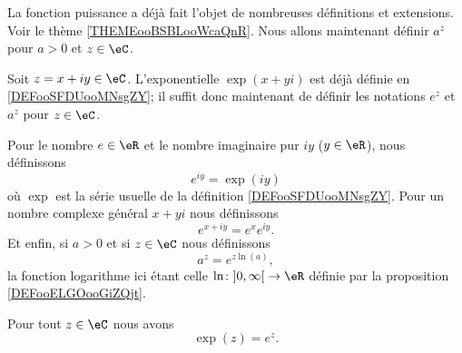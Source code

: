 \begin{normaltext}		\label{NORMooROGZooDtzzpQ}
	La fonction puissance a déjà fait l'objet de nombreuses définitions et extensions. Voir le thème \ref{THEMEooBSBLooWcaQnR}. Nous allons maintenant définir \( a^z\) pour \( a>0\) et \( z\in \eC\).

	Soit \( z=x+iy\in \eC\). L'exponentielle \( \exp(x+yi)\) est déjà définie en \ref{DEFooSFDUooMNsgZY}; il suffit donc maintenant de définir les notations \(  e^{z}\) et \( a^z\) pour \( z\in \eC\).
\end{normaltext}

\begin{definition}      \label{DEFooRBTDooNLcWGj}			%
	Pour le nombre \( e\in \eR\) et le nombre imaginaire pur \( iy\) (\( y\in \eR\)), nous définissons
	\begin{equation}
		e^{iy}=\exp(iy)
	\end{equation}
	où \( \exp\) est la série usuelle de la définition \ref{DEFooSFDUooMNsgZY}. Pour un nombre complexe général \( x+yi\) nous définissons
	\begin{equation}
		e^{x+iy}= e^{x} e^{iy}.
	\end{equation}
	Et enfin, si \( a>0\) et si \( z\in \eC\) nous définissons
	\begin{equation}
		a^z= e^{z\ln(a)},
	\end{equation}
	la fonction logarithme ici étant celle \( \ln\colon \mathopen] 0 , \infty \mathclose[\to \eR\) définie par la proposition \ref{DEFooELGOooGiZQjt}.
\end{definition}

\begin{proposition}     \label{PROPooWSDKooJREQGk}	%
	Pour tout \( z\in \eC\) nous avons
	\begin{equation}
		\exp(z)= e^{z}.
	\end{equation}
\end{proposition}

